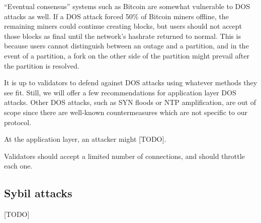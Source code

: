 ``Eventual consensus'' systems such as Bitcoin are somewhat vulnerable to DOS attacks as well. If a DOS attack forced 50\% of Bitcoin miners offline, the remaining miners could continue creating blocks, but users should not accept those blocks as final until the network's hashrate returned to normal. This is because users cannot distinguish between an outage and a partition, and in the event of a partition, a fork on the other side of the partition might prevail after the partition is resolved.

It is up to validators to defend against DOS attacks using whatever methods they see fit. Still, we will offer a few recommendations for application layer DOS attacks. Other DOS attacks, such as SYN floods or NTP amplification, are out of scope since there are well-known countermeasures which are not specific to our protocol.

At the application layer, an attacker might [TODO].

Validators should accept a limited number of connections, and should throttle each one.


\subsection{Sybil attacks}

[TODO]


